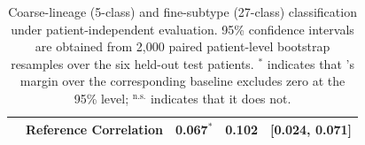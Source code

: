 \begin{table}[t]
\begin{tabular*}{\columnwidth}{@{\extracolsep{\fill}}llccc@{}}
& Reference Correlation
& 0.067$^{*}$
& 0.102
& [0.024, 0.071] \\

\bottomrule
\end{tabular*}

\caption{
Coarse-lineage (5-class) and fine-subtype (27-class) classification
under patient-independent evaluation.
95\% confidence intervals are obtained from 2,000 paired patient-level
bootstrap resamples over the six held-out test patients.
$^{*}$ indicates that \ourmethod{}'s margin over the corresponding
baseline excludes zero at the 95\% level;
$^{\mathrm{n.s.}}$ indicates that it does not.
}
\label{tab:main}

\end{table}